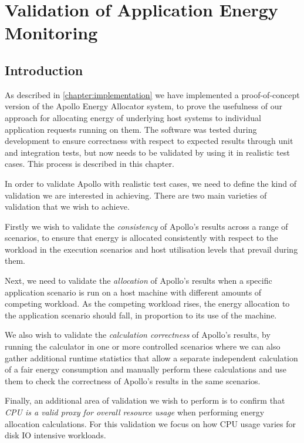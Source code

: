 \chapter{Validation of Application Energy Monitoring}
\label{chapter:validation}

\section{Introduction}

As described in \cref{chapter:implementation} we have implemented a proof-of-concept version of the Apollo Energy Allocator system, to prove the usefulness of our approach for allocating energy of underlying host systems to individual application requests running on them.  The software was tested during development to ensure correctness with respect to expected results through unit and integration tests, but now needs to be validated by using it in realistic test cases.  This process is described in this chapter.

In order to validate Apollo with realistic test cases, we need to define the kind of validation we are interested in achieving.  There are two main varieties of validation that we wish to achieve.

Firstly we wish to validate the \emph{consistency} of Apollo's results across a range of scenarios, to ensure that energy is allocated consistently with respect to the workload in the execution scenarios and host utilisation levels that prevail during them.

Next, we need to validate the \emph{allocation} of Apollo's results when a specific application scenario is run on a host machine with different amounts of competing workload.  As the competing workload rises, the energy allocation to the application scenario should fall, in proportion to its use of the machine.

We also wish to validate the \emph{calculation correctness} of Apollo's results, by running the calculator in one or more controlled scenarios where we can also gather additional runtime statistics that allow a separate independent calculation of a fair energy consumption and manually perform these calculations and use them to check the correctness of Apollo's results in the same scenarios.

Finally, an additional area of validation we wish to perform is to confirm that \emph{CPU is a valid proxy for overall resource usage} when performing energy allocation calculations.  For this validation we focus on how CPU usage varies for disk IO intensive workloads.

